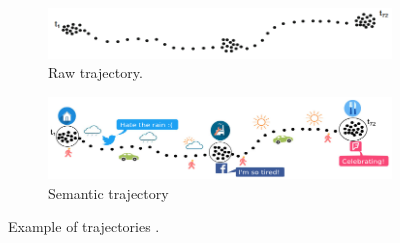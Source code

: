 \documentclass{article}
\theoremstyle{definition}
\theoremstyle{remark}
\begin{document}
\begin{figure}[!h]

\centering
\begin{subfigure}{0.5\textheight}
\centering
\includegraphics[width=0.9\linewidth]{figures/raw_trajectory_example.png} 
\caption{Raw trajectory.}
\label{fig:raw_trajectory_example}
\end{subfigure}
\begin{subfigure}{0.5\textheight}
\centering
\includegraphics[width=0.9\linewidth]{figures/semantic_trajectory_example.png}
\caption{Semantic trajectory}
\label{fig:semantic_trajectory_example}
\end{subfigure}

\caption{Example of trajectories \citep{ferrero_mastermovelets_2020}.}
\label{fig:trajectory_example}
\end{figure}
\end{document}
